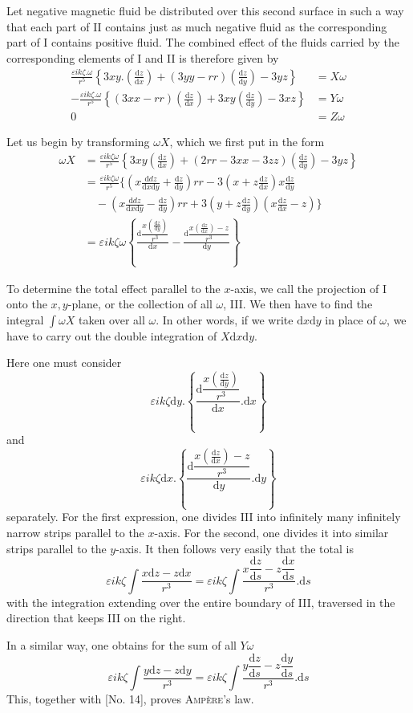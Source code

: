 Let negative magnetic fluid be distributed over this second surface in such a way that each part of II contains just as much negative fluid as the corresponding part of I contains positive fluid. The combined effect of the fluids carried by the corresponding elements of I and II is therefore given by
\[
\begin{aligned}
\frac{\varepsilon ik\zeta.\omega}{r^5}\left\{3xy.\left(\frac{\mathrm dz}{\mathrm dx}\right)+(3yy-rr)\left(\frac{\mathrm dz}{\mathrm dy}\right)-3yz\right\}&=X\omega\\
-\frac{\varepsilon ik\zeta.\omega}{r^5}\left\{(3xx-rr)\left(\frac{\mathrm dz}{\mathrm dx}\right)+3xy\left(\frac{\mathrm dz}{\mathrm dy}\right)-3xz\right\}&=Y\omega\\
0&=Z\omega
\end{aligned}
\]

Let us begin by transforming $\omega X$, which we first put in the form
\[
\begin{aligned}
\omega X&=\frac{\varepsilon ik\zeta\omega}{r^5}\left\{3xy\left(\frac{\mathrm dz}{\mathrm dx}\right)+(2rr-3xx-3zz)\left(\frac{\mathrm dz}{\mathrm dy}\right)-3yz\right\}\\
&=\frac{\varepsilon ik\zeta\omega}{r^5}\Big\{\left(x\frac{\mathrm ddz}{\mathrm dx\mathrm dy}+\frac{\mathrm dz}{\mathrm dy}\right)rr-3\left(x+z\frac{\mathrm dz}{\mathrm dx}\right)x\frac{\mathrm dz}{\mathrm dy}\\
&\quad-\left(x\frac{\mathrm ddz}{\mathrm dx\mathrm dy}-\frac{\mathrm dz}{\mathrm dy}\right)rr+3\left(y+z\frac{\mathrm dz}{\mathrm dy}\right)\left(x\frac{\mathrm dz}{\mathrm dx}-z\right)\Big\}\\
&=\varepsilon ik\zeta\omega\left\{\frac{\mathrm d\dfrac{x\left(\frac{\mathrm dz}{\mathrm dy}\right)}{r^3}}{\mathrm dx}-\frac{\mathrm d\dfrac{x\left(\frac{\mathrm dz}{\mathrm dx}\right)-z}{r^3}}{\mathrm dy}\right\}
\end{aligned}
\]

To determine the total effect parallel to the $x$-axis, we call the projection of I onto the $x,y$-plane, or the collection of all $\omega$, III. We then have to find the integral $\int\omega X$ taken over all $\omega$. In other words, if we write $\mathrm dx\mathrm dy$ in place of $\omega$, we have to carry out the double integration of $X\mathrm dx\mathrm dy$.

Here one must consider
\[
\varepsilon ik\zeta\mathrm dy.\left\{\frac{\mathrm d\dfrac{x\left(\frac{\mathrm dz}{\mathrm dy}\right)}{r^3}}{\mathrm dx}.\mathrm dx\right\}
\]
and
\[
\varepsilon ik\zeta\mathrm dx.\left\{\frac{\mathrm d\dfrac{x\left(\frac{\mathrm dz}{\mathrm dx}\right)-z}{r^3}}{\mathrm dy}.\mathrm dy\right\}
\]
separately. For the first expression, one divides III into infinitely many infinitely narrow strips parallel to the $x$-axis. For the second, one divides it into similar strips parallel to the $y$-axis. It then follows very easily that the total is
\[
\varepsilon ik\zeta\int\frac{x\mathrm dz-z\mathrm dx}{r^3}=\varepsilon ik\zeta\int\frac{x\dfrac{\mathrm dz}{\mathrm ds}-z\dfrac{\mathrm dx}{\mathrm ds}}{r^3}.\mathrm ds
\]
with the integration extending over the entire boundary of III, traversed in the direction that keeps III on the right.

In a similar way, one obtains for the sum of all $Y\omega$
\[
\varepsilon ik\zeta\int\frac{y\mathrm dz-z\mathrm dy}{r^3}=\varepsilon ik\zeta\int\frac{y\dfrac{\mathrm dz}{\mathrm ds}-z\dfrac{\mathrm dy}{\mathrm ds}}{r^3}.\mathrm ds
\]
This, together with [No. 14], proves \textsc{Ampère}’s law.

